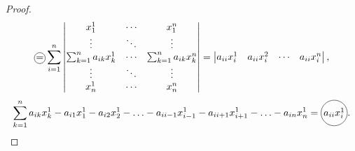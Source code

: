 \begin{proof}
    \[
        \circled{=} \sum_{i=1}^{n}\left|\begin{matrix}
            x_1^1                     & \cdots & x_1^n                     \\
            \vdots                    & \ddots & \vdots                    \\
            \sum_{k=1}^{n}a_{ik}x_k^1 & \cdots & \sum_{k=1}^{n}a_{ik}x_k^n \\
            \vdots                    & \ddots & \vdots                    \\
            x_n^1                     & \cdots & x_n^n
        \end{matrix}\right| = \left|\begin{matrix}
            a_{ii}x_i^1 & a_{ii}x_i^2 & \cdots & a_{ii}x_i^n
        \end{matrix}\right|,
    \]
    \[
        \sum_{k=1}^{n}a_{ik}x_k^1 - a_{i1}x_1^1 - a_{i2}x_2^1 - \ldots - a_{ii-1}x_{i-1}^1 - a_{ii+1}x_{i+1}^1 - \ldots - a_{in}x_n^1 = \circled{$ a_{ii}x_i^1 $}.
    \]
\end{proof}